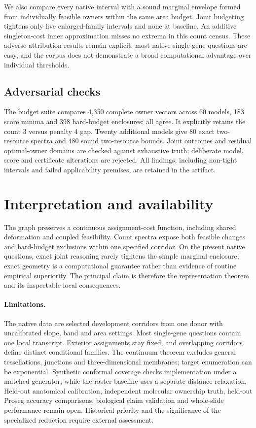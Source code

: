 \documentclass[10pt,letterpaper]{article}
\begin{document}
We also compare every native interval with a sound marginal envelope formed from individually feasible owners within the same area budget. Joint budgeting tightens only five enlarged-family intervals and none at baseline. An additive singleton-cost inner approximation misses no extrema in this count census. These adverse attribution results remain explicit: most native single-gene questions are easy, and the corpus does not demonstrate a broad computational advantage over individual thresholds.

\subsection{Adversarial checks}
The budget suite compares 4,350 complete owner vectors across 60 models, 183 score minima and 398 hard-budget enclosures; all agree. It explicitly retains the count 3 versus penalty 4 gap. Twenty additional models give 80 exact two-resource spectra and 480 sound two-resource bounds. Joint outcomes and residual optimal-owner domains are checked against exhaustive truth; deliberate model, score and certificate alterations are rejected. All findings, including non-tight intervals and failed applicability premises, are retained in the artifact.

\section{Interpretation and availability}
The graph preserves a continuous assignment-cost function, including shared deformation and coupled feasibility. Count spectra expose both feasible changes and hard-budget exclusions within one specified corridor. On the present native questions, exact joint reasoning rarely tightens the simple marginal enclosure; exact geometry is a computational guarantee rather than evidence of routine empirical superiority. The principal claim is therefore the representation theorem and its inspectable local consequences.

\paragraph{Limitations.}
The native data are selected development corridors from one donor with uncalibrated slope, band and area settings. Most single-gene questions contain one local transcript. Exterior assignments stay fixed, and overlapping corridors define distinct conditional families. The continuum theorem excludes general tessellations, junctions and three-dimensional membranes; target enumeration can be exponential. Synthetic conformal coverage checks implementation under a matched generator, while the raster baseline uses a separate distance relaxation. Held-out anatomical calibration, independent molecular ownership truth, held-out Proseg accuracy comparisons, biological claim validation and whole-slide performance remain open. Historical priority and the significance of the specialized reduction require external assessment.
\end{document}
